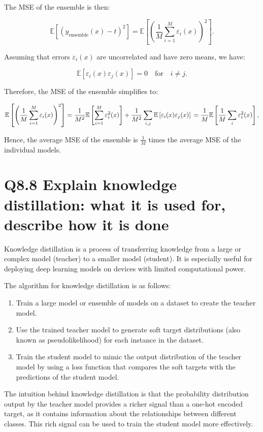 \documentclass[11pt]{article}
\begin{document}
The MSE of the ensemble is then:

\[
\mathbb{E}\left[\left(y_{\text{ensemble}}(x) - t\right)^2\right] = \mathbb{E}\left[\left(\frac{1}{M} \sum_{i=1}^{M} \varepsilon_i(x)\right)^2\right].
\]

Assuming that errors \( \varepsilon_i(x) \) are uncorrelated and have zero means, we have:

\[
\mathbb{E}\left[\varepsilon_i(x)\varepsilon_j(x)\right] = 0 \quad \text{for} \quad i \neq j.
\]

Therefore, the MSE of the ensemble simplifies to:

\[
\mathbb{E}\left[\left(\frac{1}{M} \sum_{i=1}^{M} \varepsilon_i(x)\right)^2\right] = \frac{1}{M^2} \mathbb{E}\left[\sum_{i=1}^{M} \varepsilon_i^2(x)\right] + \frac{1}{M^2} \sum_{i, j} \mathbb{E}\left[\varepsilon_i(x)\varepsilon_j(x)\right] \\
= \frac{1}{M}\mathbb{E}\left[\frac{1}{M}\sum_{i}\varepsilon_{i}^{2}(x)\right],
\]

Hence, the average MSE of the ensemble is \( \frac{1}{M} \) times the average MSE of the individual models.

\section{Q8.8 Explain knowledge distillation: what it is used for, describe how it is done}

Knowledge distillation is a process of transferring knowledge from a large or complex model (teacher) to a smaller model (student). It is especially useful for deploying deep learning models on devices with limited computational power.

The algorithm for knowledge distillation is as follows:
\begin{enumerate}
    \item Train a large model or ensemble of models on a dataset to create the teacher model.
    \item Use the trained teacher model to generate soft target distributions (also known as pseudolikelihood) for each instance in the dataset.
    \item Train the student model to mimic the output distribution of the teacher model by using a loss function that compares the soft targets with the predictions of the student model.
\end{enumerate}

The intuition behind knowledge distillation is that the probability distribution output by the teacher model provides a richer signal than a one-hot encoded target, as it contains information about the relationships between different classes. This rich signal can be used to train the student model more effectively.
\end{document}
